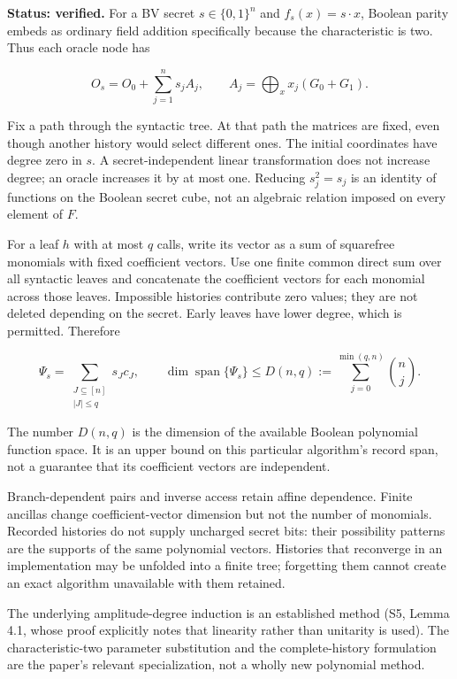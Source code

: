 \documentclass[
  11pt,
]{article}
\begin{document}
\textbf{Status: verified.} For a BV secret \(s\in\{0,1\}^n\) and
\(f_s(x)=s\cdot x\), Boolean parity embeds as ordinary field addition
specifically because the characteristic is two. Thus each oracle node
has

\[
O_s=O_0+\sum_{j=1}^n s_j A_j,
\qquad
A_j=\bigoplus_x x_j(G_0+G_1).
\]

Fix a path through the syntactic tree. At that path the matrices are
fixed, even though another history would select different ones. The
initial coordinates have degree zero in \(s\). A secret-independent
linear transformation does not increase degree; an oracle increases it
by at most one. Reducing \(s_j^2=s_j\) is an identity of functions on
the Boolean secret cube, not an algebraic relation imposed on every
element of \(F\).

For a leaf \(h\) with at most \(q\) calls, write its vector as a sum of
squarefree monomials with fixed coefficient vectors. Use one finite
common direct sum over all syntactic leaves and concatenate the
coefficient vectors for each monomial across those leaves. Impossible
histories contribute zero values; they are not deleted depending on the
secret. Early leaves have lower degree, which is permitted. Therefore

\[
\Psi_s=\sum_{\substack{J\subseteq[n]\\|J|\le q}}s_Jc_J,
\qquad
\dim\operatorname{span}\{\Psi_s\}\le
D(n,q):=\sum_{j=0}^{\min(q,n)}\binom nj.
\]

The number \(D(n,q)\) is the dimension of the available Boolean
polynomial function space. It is an upper bound on this particular
algorithm's record span, not a guarantee that its coefficient vectors
are independent.

Branch-dependent pairs and inverse access retain affine dependence.
Finite ancillas change coefficient-vector dimension but not the number
of monomials. Recorded histories do not supply uncharged secret bits:
their possibility patterns are the supports of the same polynomial
vectors. Histories that reconverge in an implementation may be unfolded
into a finite tree; forgetting them cannot create an exact algorithm
unavailable with them retained.

The underlying amplitude-degree induction is an established method (S5,
Lemma 4.1, whose proof explicitly notes that linearity rather than
unitarity is used). The characteristic-two parameter substitution and
the complete-history formulation are the paper's relevant
specialization, not a wholly new polynomial method.
\end{document}
